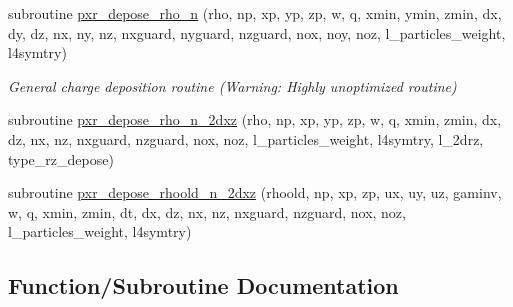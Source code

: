 \begin{DoxyCompactItemize}
subroutine \hyperlink{charge__deposition_8_f90_a1ba91732b5b34c8c04f7570c8df67c26}{pxr\+\_\+depose\+\_\+rho\+\_\+n} (rho, np, xp, yp, zp, w, q, xmin, ymin, zmin, dx, dy, dz, nx, ny, nz, nxguard, nyguard, nzguard, nox, noy, noz, l\+\_\+particles\+\_\+weight, l4symtry)
\begin{DoxyCompactList}\small\item\em General charge deposition routine (Warning\+: Highly unoptimized routine) \end{DoxyCompactList}\item 
subroutine \hyperlink{charge__deposition_8_f90_a899c2820e69c525f781f0a6c62d3b116}{pxr\+\_\+depose\+\_\+rho\+\_\+n\+\_\+2dxz} (rho, np, xp, yp, zp, w, q, xmin, zmin, dx, dz, nx, nz, nxguard, nzguard, nox, noz, l\+\_\+particles\+\_\+weight, l4symtry, l\+\_\+2drz, type\+\_\+rz\+\_\+depose)
\item 
subroutine \hyperlink{charge__deposition_8_f90_a496878f2bdf85d8dec4a059d6bc40a0f}{pxr\+\_\+depose\+\_\+rhoold\+\_\+n\+\_\+2dxz} (rhoold, np, xp, zp, ux, uy, uz, gaminv, w, q, xmin, zmin, dt, dx, dz, nx, nz, nxguard, nzguard, nox, noz, l\+\_\+particles\+\_\+weight, l4symtry)
\end{DoxyCompactItemize}


\subsection{Function/\+Subroutine Documentation}

